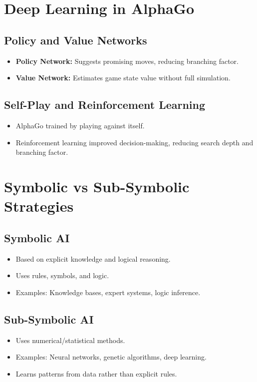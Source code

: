 \section{Deep Learning in AlphaGo}

\subsection{Policy and Value Networks}
\begin{itemize}
    \item \textbf{Policy Network:} Suggests promising moves, reducing branching factor.
    \item \textbf{Value Network:} Estimates game state value without full simulation.
\end{itemize}

\subsection{Self-Play and Reinforcement Learning}
\begin{itemize}
    \item AlphaGo trained by playing against itself.
    \item Reinforcement learning improved decision-making, reducing search depth and branching factor.
\end{itemize}

\section{Symbolic vs Sub-Symbolic Strategies}

\subsection{Symbolic AI}
\begin{itemize}
    \item Based on explicit knowledge and logical reasoning.
    \item Uses rules, symbols, and logic.
    \item Examples: Knowledge bases, expert systems, logic inference.
\end{itemize}

\subsection{Sub-Symbolic AI}
\begin{itemize}
    \item Uses numerical/statistical methods.
    \item Examples: Neural networks, genetic algorithms, deep learning.
    \item Learns patterns from data rather than explicit rules.
\end{itemize}

